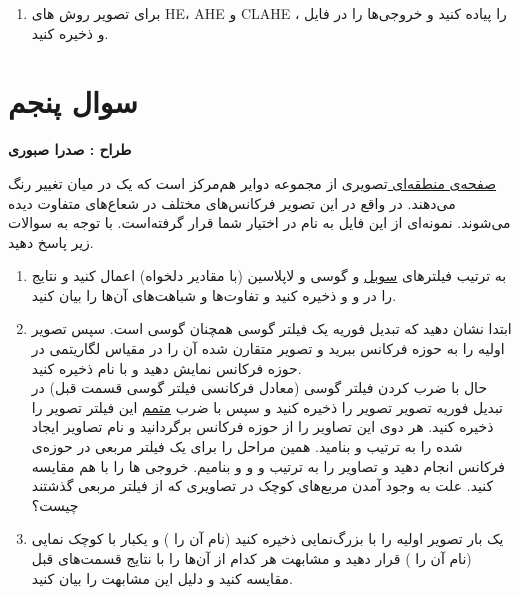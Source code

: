 \documentclass[a4paper]{article}
\begin{document}
\begin{enumerate}
{\begin{figure}[H]
\begin{subfigure}[b]{0.3\linewidth}
			\caption*{Image II}
		\end{subfigure}
	\end{figure}
}
\item
برای تصویر
روش های HE، AHE و CLAHE را پیاده کنید و خروجی‌ها را در فایل 
، 
 و
   ذخیره کنید.
\end{enumerate}

\section*{سوال پنجم}
\textbf{طراح :‌ صدرا صبوری}
\vspace{0.3cm}

\href{https://en.wikipedia.org/wiki/Zone_plate}{صفحه‌ی منطقه‌ای }
تصویری از مجموعه دوایر هم‌مرکز است که یک در میان تغییر رنگ می‌دهند. در واقع در این تصویر فرکانس‌های مختلف در شعاع‌های متفاوت دیده می‌شوند. نمونه‌ای از این فایل به نام 
در اختیار شما قرار گرفته‌است. با توجه به سوالات زیر پاسخ دهید.
\begin{enumerate}
	\item

به ترتیب فیلترهای 
\href{https://en.wikipedia.org/wiki/Sobel_operator}{سوبل} 
و گوسی و لاپلاسین (با مقادیر دلخواه) اعمال کنید و نتایج را در
 و
 و
 ذخیره کنید و تفاوت‌ها و شباهت‌های آن‌ها را بیان کنید.

\item
ابتدا نشان دهید که تبدیل فوریه یک فیلتر گوسی همچنان گوسی است. سپس تصویر اولیه را به حوزه فرکانس ببرید و تصویر متقارن شده آن را در مقیاس لگاریتمی در حوزه فرکانس نمایش دهید و با نام  
ذخیره کنید. 
\\
حال با ضرب کردن فیلتر گوسی (معادل فرکانسی فیلتر گوسی قسمت قبل) در تبدیل فوریه تصویر تصویر 
 را ذخیره کنید و سپس با ضرب 
\href{https://en.wikipedia.org/wiki/Negative_(photography)}{متمم}
این فیلتر تصویر
 را ذخیره کنید. هر دوی این تصاویر را از حوزه فرکانس برگردانید و نام تصاویر ایجاد شده را به ترتیب
و 
بنامید.
همین مراحل را برای یک فیلتر مربعی در حوزه‌ی فرکانس انجام دهید و تصاویر را به ترتیب 
و 
و 
و 
بنامیم.
خروجی ها را با هم مقایسه کنید. علت به وجود آمدن مربع‌های کوچک در تصاویری که از فیلتر مربعی گذشتند چیست؟
\item
یک بار تصویر اولیه را با بزرگ‌نمایی ذخیره کنید (نام آن را 
)
 و یکبار با کوچک نمایی (نام آن را 
 )
  قرار دهید و مشابهت هر کدام از آن‌ها را با نتایج قسمت‌های قبل مقایسه کنید و دلیل این مشابهت را بیان کنید.
\end{enumerate}
\end{document}
